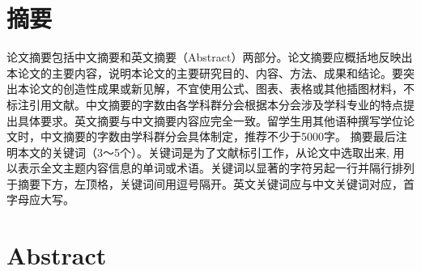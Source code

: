 \maketitle%
\MAKETITLE%

\makedeclaration

\intobmk\chapter*{\texorpdfstring{摘\quad 要}{摘要}}
\setcounter{page}{1}
  
  论文摘要包括中文摘要和英文摘要（Abstract）两部分。论文摘要应概括地反映出本论文的主要内容，说明本论文的主要研究目的、内容、方法、成果和结论。要突出本论文的创造性成果或新见解，不宜使用公式、图表、表格或其他插图材料，不标注引用文献。中文摘要的字数由各学科群分会根据本分会涉及学科专业的特点提出具体要求。英文摘要与中文摘要内容应完全一致。留学生用其他语种撰写学位论文时，中文摘要的字数由学科群分会具体制定，推荐不少于5000字。
摘要最后注明本文的关键词（3～5个）。关键词是为了文献标引工作，从论文中选取出来, 用以表示全文主题内容信息的单词或术语。关键词以显著的字符另起一行并隔行排列于摘要下方，左顶格，关键词间用逗号隔开。英文关键词应与中文关键词对应，首字母应大写。




\intobmk\chapter*{Abstract}




